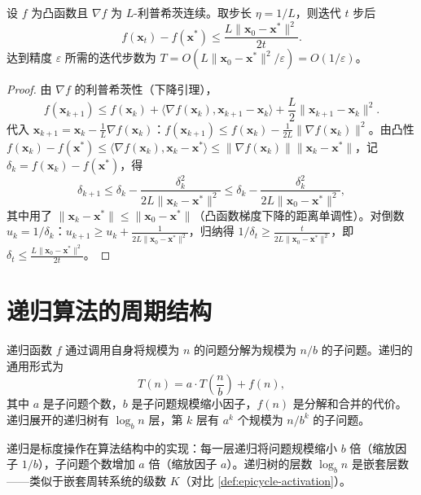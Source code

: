 \begin{proposition}[梯度下降的收敛界]\label{ch33_gd_bound}
设 $f$ 为凸函数且 $\nabla f$ 为 $L$-利普希茨连续。取步长 $\eta = 1/L$，则迭代 $t$ 步后
\[
f(\mathbf{x}_t) - f(\mathbf{x}^*) \le \frac{L \|\mathbf{x}_0 - \mathbf{x}^*\|^2}{2t}.
\]
达到精度 $\varepsilon$ 所需的迭代步数为 $T = O(L\|\mathbf{x}_0-\mathbf{x}^*\|^2/\varepsilon) = O(1/\varepsilon)$。
\end{proposition}

\begin{proof}
由 $\nabla f$ 的利普希茨性（下降引理），
\[
f(\mathbf{x}_{k+1}) \le f(\mathbf{x}_k) + \langle \nabla f(\mathbf{x}_k), \mathbf{x}_{k+1}-\mathbf{x}_k\rangle + \frac{L}{2}\|\mathbf{x}_{k+1}-\mathbf{x}_k\|^2.
\]
代入 $\mathbf{x}_{k+1} = \mathbf{x}_k - \frac{1}{L}\nabla f(\mathbf{x}_k)$：$f(\mathbf{x}_{k+1}) \le f(\mathbf{x}_k) - \frac{1}{2L}\|\nabla f(\mathbf{x}_k)\|^2$。由凸性 $f(\mathbf{x}_k) - f(\mathbf{x}^*) \le \langle \nabla f(\mathbf{x}_k), \mathbf{x}_k - \mathbf{x}^*\rangle \le \|\nabla f(\mathbf{x}_k)\|\|\mathbf{x}_k - \mathbf{x}^*\|$，记 $\delta_k = f(\mathbf{x}_k) - f(\mathbf{x}^*)$，得
\[
\delta_{k+1} \le \delta_k - \frac{\delta_k^2}{2L\|\mathbf{x}_k - \mathbf{x}^*\|^2} \le \delta_k - \frac{\delta_k^2}{2L\|\mathbf{x}_0 - \mathbf{x}^*\|^2},
\]
其中用了 $\|\mathbf{x}_k - \mathbf{x}^*\| \le \|\mathbf{x}_0 - \mathbf{x}^*\|$（凸函数梯度下降的距离单调性）。对倒数 $u_k = 1/\delta_k$：$u_{k+1} \ge u_k + \frac{1}{2L\|\mathbf{x}_0-\mathbf{x}^*\|^2}$，归纳得 $1/\delta_t \ge \frac{t}{2L\|\mathbf{x}_0-\mathbf{x}^*\|^2}$，即 $\delta_t \le \frac{L\|\mathbf{x}_0-\mathbf{x}^*\|^2}{2t}$。
\end{proof}

\section{递归算法的周期结构}

\begin{definition}[递归的数学定义]\label{def:recursion}
递归函数 $f$ 通过调用自身将规模为 $n$ 的问题分解为规模为 $n/b$ 的子问题。递归的通用形式为
\[
T(n) = a \cdot T\left(\frac{n}{b}\right) + f(n),
\]
其中 $a$ 是子问题个数，$b$ 是子问题规模缩小因子，$f(n)$ 是分解和合并的代价。递归展开的递归树有 $\log_b n$ 层，第 $k$ 层有 $a^k$ 个规模为 $n/b^k$ 的子问题。

递归是标度操作在算法结构中的实现：每一层递归将问题规模缩小 $b$ 倍（缩放因子 $1/b$），子问题个数增加 $a$ 倍（缩放因子 $a$）。递归树的层数 $\log_b n$ 是嵌套层数——类似于嵌套周转系统的级数 $K$（对比 \cref{def:epicycle-activation}）。
\end{definition}

